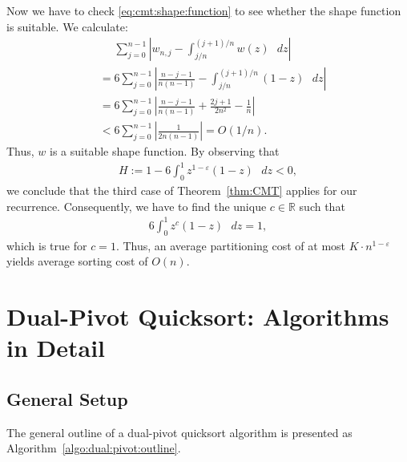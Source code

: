 \documentclass[prodmode,acmtalg]{acmsmall}
\begin{document}
    Now we have to check \eqref{eq:cmt:shape:function} to see whether the shape function is suitable. We calculate:
    \begin{align*}
        &\phantom{=} \sum_{j = 0}^{n-1} \left\vert w_{n,j} - \int_{j/n}^{(j+1)/n} w(z) \text{ $dz$} \right\vert\\
        & = 6 \sum_{j = 0}^{n-1} \left\vert\frac{n - j - 1}{n ( n - 1)} - \int_{j/n}^{(j + 1)/n} (1-z) \text{ $dz$} \right\vert\\    
        & = 6 \sum_{j = 0}^{n-1} \left\vert\frac{n - j - 1}{n ( n - 1)} + \frac{2j + 1}{2n^2} - \frac{1}{n}\right\vert\\
        & < 6 \sum_{j = 0}^{n - 1} \left\vert\frac{1}{2n(n-1)} \right\vert = O(1/n).
    \end{align*}
    Thus, $w$ is a suitable shape function.
    By observing that  
    \begin{align*}
        H := 1 - 6 \int_0^1 z^{1-\varepsilon} (1 - z) \text{ $dz$} < 0,
    \end{align*}
    we conclude that the third case of Theorem~\ref{thm:CMT} applies for our recurrence. 
    Consequently, we have to find the unique $c \in \mathbb{R}$ such that 
    \begin{align*}
	6 \int_0^1 z^c (1 - z) \text{ $dz$} = 1,
    \end{align*}
    which is true for $c = 1$. Thus, an average partitioning cost of at most $K \cdot n^{1-\varepsilon}$ 
    yields average sorting cost of $O(n)$. 




\section{Dual-Pivot Quicksort: Algorithms in Detail}\label{app:sec:algorithms}

\subsection{General Setup}
The general outline of a dual-pivot quicksort algorithm is presented as Algorithm~\ref{algo:dual:pivot:outline}.

\renewcommand{\alglinenumber}[1]{\footnotesize{#1} }
\end{document}
